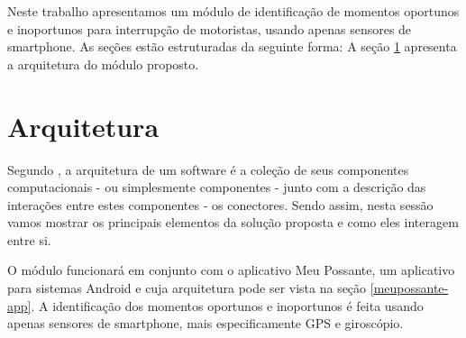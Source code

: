 \label{solucao}

Neste trabalho apresentamos um módulo de identificação de momentos oportunos e inoportunos para interrupção de
motoristas, usando apenas sensores de smartphone. As seções estão estruturadas da seguinte forma: A seção
\ref{sec-arquitetura-solucao} apresenta a arquitetura do módulo proposto.

\section{Arquitetura}
\label{sec-arquitetura-solucao}
Segundo , a arquitetura de um software é a coleção de seus componentes computacionais - ou simplesmente
componentes - junto com a descrição das interações entre estes componentes - os conectores.  Sendo assim, nesta sessão
vamos mostrar os principais elementos da solução proposta e como eles interagem entre si.

O módulo funcionará em conjunto com o aplicativo Meu Possante, um aplicativo para sistemas Android e cuja arquitetura pode ser vista
na seção \ref{meupossante-app}. A identificação dos momentos oportunos e inoportunos é feita usando apenas sensores de smartphone,
mais especificamente GPS e giroscópio.
